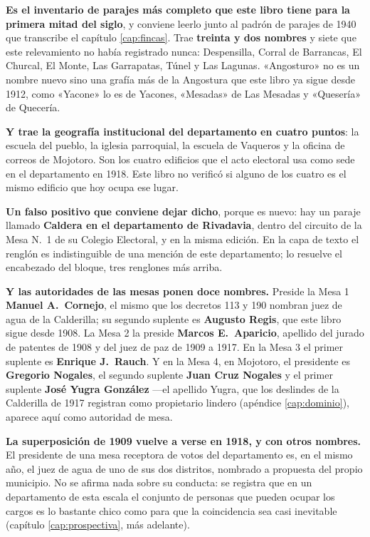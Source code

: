 \begin{cautela}
\textbf{Es el inventario de parajes más completo que este libro tiene para la primera mitad del
siglo}, y conviene leerlo junto al padrón de parajes de 1940 que transcribe el capítulo
\ref{cap:fincas}. Trae \textbf{treinta y dos nombres} y siete que este relevamiento no había
registrado nunca: Despensilla, Corral de Barrancas, El Churcal, El Monte, Las Garrapatas, Túnel
y Las Lagunas. «Angosturo» no es un nombre nuevo sino una grafía más de la Angostura que este
libro ya sigue desde 1912, como «Yacone» lo es de Yacones, «Mesadas» de Las Mesadas y
«Quesería» de Quecería.

\textbf{Y trae la geografía institucional del departamento en cuatro puntos}: la escuela del
pueblo, la iglesia parroquial, la escuela de Vaqueros y la oficina de correos de Mojotoro. Son
los cuatro edificios que el acto electoral usa como sede en el departamento en
1918. Este libro no verificó si alguno de los cuatro es el mismo edificio que hoy ocupa ese
lugar.

\textbf{Un falso positivo que conviene dejar dicho}, porque es nuevo: hay un paraje llamado
\textbf{Caldera en el departamento de Rivadavia}, dentro del circuito de la Mesa N.\ 1 de su
Colegio Electoral, y en la misma edición. En la capa de texto el renglón es indistinguible de una
mención de este departamento; lo resuelve el encabezado del bloque, tres renglones más arriba.
\end{cautela}

\textbf{Y las autoridades de las mesas ponen doce nombres.} Preside la Mesa 1 \textbf{Manuel A.\
Cornejo}, el mismo que los decretos 113 y 190 nombran juez de agua de la Calderilla; su segundo
suplente es \textbf{Augusto Regis}\index{Regis, Augusto}, que este libro sigue desde 1908. La
Mesa 2 la preside \textbf{Marcos E.\ Aparicio}, apellido del jurado de patentes de 1908 y del
juez de paz de 1909 a 1917. En la Mesa 3 el primer suplente es \textbf{Enrique J.\ Rauch}. Y en
la Mesa 4, en Mojotoro, el presidente es \textbf{Gregorio Nogales}, el segundo suplente
\textbf{Juan Cruz Nogales} y el primer suplente \textbf{José Yugra González} ---el apellido Yugra,
que los deslindes de la Calderilla de 1917 registran como propietario lindero (apéndice
\ref{cap:dominio}), aparece aquí como autoridad de mesa.

\begin{cautela}
\textbf{La superposición de 1909 vuelve a verse en 1918, y con otros nombres.} El presidente de
una mesa receptora de votos del departamento es, en el mismo año, el juez de agua de uno de sus
dos distritos, nombrado a propuesta del propio municipio. No se afirma nada sobre su conducta:
se registra que en un departamento de esta escala el conjunto de personas que pueden ocupar los
cargos es lo bastante chico como para que la coincidencia sea casi inevitable (capítulo
\ref{cap:prospectiva}, más adelante).
\end{cautela}

